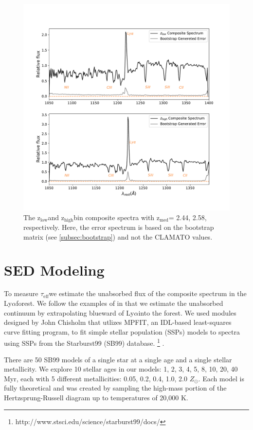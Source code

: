 \documentclass[preprint2,times,tighten]{aastex6}
\newcommand{\teff}{$\tau_\mathrm{eff}$\space}
\newcommand{\lya}{Ly$\alpha$\space}
\newcommand{\zem}{$\mathrm{z_{med}}$\space}
\newcommand{\hiz}{$\mathrm{z_{high}}$\space}
\newcommand{\loz}{$\mathrm{z_{low}}$\space}
\begin{document}
\begin{figure}[ht]
    \centering
    \includegraphics[scale = .5]{composites.pdf}
    \caption{The \loz and \hiz bin composite spectra with \zem = 2.44, 2.58, respectively. Here, the error spectrum is based on the bootstrap matrix (see \ref{subsec:bootstrap}) and not the CLAMATO values.}
    \label{fig:stack_1}
\end{figure}

\section{SED Modeling}%

To measure \teff we estimate the unabsorbed flux of the composite spectrum in the \lya forest. We follow the examples of \cite{paris_principal_2011, prochaska_towards_2014} in that we estimate the unabsorbed continuum by extrapolating blueward of \lya into the forest. We used modules designed by John Chisholm that utlizes MPFIT, an IDL-based least-squares curve fitting program, to fit simple stellar population (SSPs) models to spectra using SSPs from the Starburst99 (SB99) database. \footnote{http://www.stsci.edu/science/starburst99/docs/} \citep{1999ApJS..123....3L}.

There are 50 SB99 models of a single star at a single age and a single stellar metallicity. We explore 10 stellar ages in our models: 1, 2, 3, 4, 5, 8, 10, 20, 40 Myr, each with 5 different metallicities: 0.05, 0.2, 0.4, 1.0, 2.0 $Z_\odot$. Each model is fully theoretical and was created by sampling the high-mass portion of the Hertzsprung-Russell diagram up to temperatures of 20,000 K. 
\end{document}
